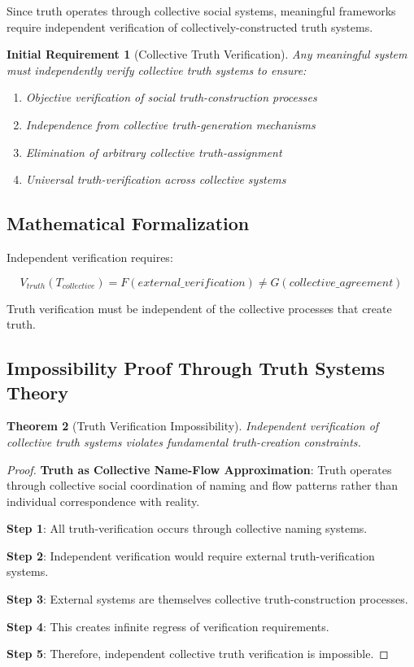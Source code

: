 \documentclass[12pt,a4paper]{article}
\newtheorem{theorem}{Theorem}[section]
\newtheorem{requirement}[theorem]{Initial Requirement}
\begin{document}
Since truth operates through collective social systems, meaningful frameworks require independent verification of collectively-constructed truth systems.

\begin{requirement}[Collective Truth Verification]
Any meaningful system must independently verify collective truth systems to ensure:
\begin{enumerate}
\item Objective verification of social truth-construction processes
\item Independence from collective truth-generation mechanisms
\item Elimination of arbitrary collective truth-assignment
\item Universal truth-verification across collective systems
\end{enumerate}
\end{requirement}

\subsection{Mathematical Formalization}

Independent verification requires:

$$V_{truth}(T_{collective}) = F(external\_verification) \neq G(collective\_agreement)$$

Truth verification must be independent of the collective processes that create truth.

\subsection{Impossibility Proof Through Truth Systems Theory}

\begin{theorem}[Truth Verification Impossibility]
Independent verification of collective truth systems violates fundamental truth-creation constraints.
\end{theorem}

\begin{proof}
\textbf{Truth as Collective Name-Flow Approximation}: Truth operates through collective social coordination of naming and flow patterns rather than individual correspondence with reality.

\textbf{Step 1}: All truth-verification occurs through collective naming systems.

\textbf{Step 2}: Independent verification would require external truth-verification systems.

\textbf{Step 3}: External systems are themselves collective truth-construction processes.

\textbf{Step 4}: This creates infinite regress of verification requirements.

\textbf{Step 5}: Therefore, independent collective truth verification is impossible.
\end{proof}
\end{document}
